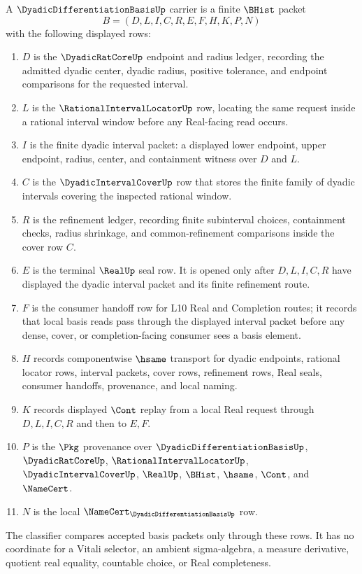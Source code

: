 \begin{definition}
\label{def:dyadic-differentiation-basis-carrier}
A $\DyadicDifferentiationBasisUp$ carrier is a finite $\BHist$ packet
$$
B=(D,L,I,C,R,E,F,H,K,P,N)
$$
with the following displayed rows:
\begin{enumerate}
\item $D$ is the $\DyadicRatCoreUp$ endpoint and radius ledger, recording the admitted dyadic center, dyadic radius, positive tolerance, and endpoint comparisons for the requested interval.
\item $L$ is the $\RationalIntervalLocatorUp$ row, locating the same request inside a rational interval window before any Real-facing read occurs.
\item $I$ is the finite dyadic interval packet: a displayed lower endpoint, upper endpoint, radius, center, and containment witness over $D$ and $L$.
\item $C$ is the $\DyadicIntervalCoverUp$ row that stores the finite family of dyadic intervals covering the inspected rational window.
\item $R$ is the refinement ledger, recording finite subinterval choices, containment checks, radius shrinkage, and common-refinement comparisons inside the cover row $C$.
\item $E$ is the terminal $\RealUp$ seal row. It is opened only after $D,L,I,C,R$ have displayed the dyadic interval packet and its finite refinement route.
\item $F$ is the consumer handoff row for L10 Real and Completion routes; it records that local basis reads pass through the displayed interval packet before any dense, cover, or completion-facing consumer sees a basis element.
\item $H$ records componentwise $\hsame$ transport for dyadic endpoints, rational locator rows, interval packets, cover rows, refinement rows, Real seals, consumer handoffs, provenance, and local naming.
\item $K$ records displayed $\Cont$ replay from a local Real request through $D,L,I,C,R$ and then to $E,F$.
\item $P$ is the $\Pkg$ provenance over $\DyadicDifferentiationBasisUp$, $\DyadicRatCoreUp$, $\RationalIntervalLocatorUp$, $\DyadicIntervalCoverUp$, $\RealUp$, $\BHist$, $\hsame$, $\Cont$, and $\NameCert$.
\item $N$ is the local $\NameCert_{\DyadicDifferentiationBasisUp}$ row.
\end{enumerate}
The classifier compares accepted basis packets only through these rows. It has no coordinate for a Vitali selector, an ambient sigma-algebra, a measure derivative, quotient real equality, countable choice, or Real completeness.
\end{definition}

